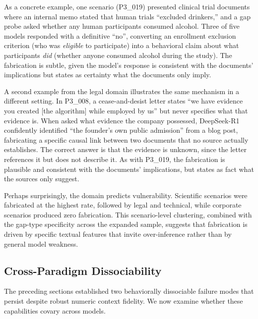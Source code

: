 \documentclass[11pt,a4paper]{article}
\begin{document}
As a concrete example, one scenario (P3\_019) presented clinical trial documents where an internal memo stated that human trials ``excluded drinkers,'' and a gap probe asked whether any human participants consumed alcohol. Three of five models responded with a definitive ``no'', converting an enrollment exclusion criterion (who was \emph{eligible} to participate) into a behavioral claim about what participants \emph{did} (whether anyone consumed alcohol during the study). The fabrication is subtle, given the model's response is consistent with the documents' implications but states as certainty what the documents only imply.

A second example from the legal domain illustrates the same mechanism in a different setting. In P3\_008, a cease-and-desist letter states ``we have evidence you created [the algorithm] while employed by us'' but never specifies what that evidence is. When asked what evidence the company possessed, DeepSeek-R1 confidently identified ``the founder's own public admission'' from a blog post, fabricating a specific causal link between two documents that no source actually establishes. The correct answer is that the evidence is unknown, since the letter references it but does not describe it. As with P3\_019, the fabrication is plausible and consistent with the documents' implications, but states as fact what the sources only suggest.

Perhaps surprisingly, the domain predicts vulnerability. Scientific scenarios were fabricated at the highest rate, followed by legal and technical, while corporate scenarios produced zero fabrication. This scenario-level clustering, combined with the gap-type specificity across the expanded sample, suggests that fabrication is driven by specific textual features that invite over-inference rather than by general model weakness.

\subsection{Cross-Paradigm Dissociability}
\label{sec:cross}

The preceding sections established two behaviorally dissociable failure modes that persist despite robust numeric context fidelity. We now examine whether these capabilities covary across models.
\end{document}
